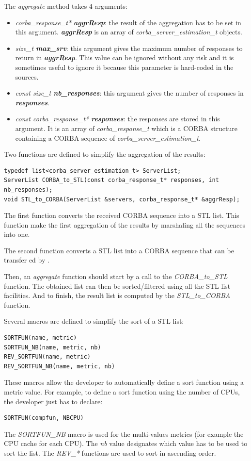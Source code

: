 \noindent The \textit{aggregate} method takes 4 arguments:
\begin{itemize}
  \item \textit{corba\_response\_t* \bf aggrResp}: the result of the aggregation
    has to be set in this argument. \textit{\bf aggrResp} is an array of
    \textit{corba\_server\_estimation\_t} objects. 
  \item \textit{size\_t \bf max\_srv}: this argument gives the maximum number
    of responses to return in \textit{\bf aggrResp}. This value can be ignored
    without any risk and it is sometimes useful to ignore it because this
    parameter is hard-coded in the \diet sources.
  \item \textit{const size\_t \bf nb\_responses}: this argument gives the number
    of responses in \textit{\bf responses}.
  \item \textit{const corba\_response\_t* \bf responses}: the responses are
    stored in this argument. It is an array of \textit{corba\_response\_t}
    which is a CORBA structure containing a CORBA sequence of
    \textit{corba\_server\_estimation\_t}.
\end{itemize}

\noindent Two functions are defined to simplify the aggregation of the results:
\begin{verbatim}
typedef list<corba_server_estimation_t> ServerList;
ServerList CORBA_to_STL(const corba_response_t* responses, int nb_responses);
void STL_to_CORBA(ServerList &servers, corba_response_t* &aggrResp);
\end{verbatim}
The first function converts the received CORBA sequence into a STL list. This
function make the first aggregation of the results by marshaling all the
sequences into one.

\noindent The second function converts a STL list into a CORBA sequence that
can be transfer ed by \diet.

Then, an \textit{aggregate} function should start by a call to the
\textit{CORBA\_to\_STL} function. The obtained list can then be sorted/filtered
using all the STL list facilities. And to finish, the result list is computed
by the \textit{STL\_to\_CORBA} function.

Several macros are defined to simplify the
sort of a STL list:
\begin{verbatim}
SORTFUN(name, metric)
SORTFUN_NB(name, metric, nb)
REV_SORTFUN(name, metric)
REV_SORTFUN_NB(name, metric, nb)
\end{verbatim}
These macros allow the developer to automatically define a sort function
using a metric value. For example, to define a sort function using the
number of CPUs, the developer just has to declare:
\begin{verbatim}
SORTFUN(compfun, NBCPU)
\end{verbatim}
The \textit{SORTFUN\_NB} macro is used for the multi-values metrics (for
example the CPU cache for each CPU). The \textit{nb} value designates which
value has to be used to sort the list.
The \textit{REV\_*} functions are used to sort in ascending order.

